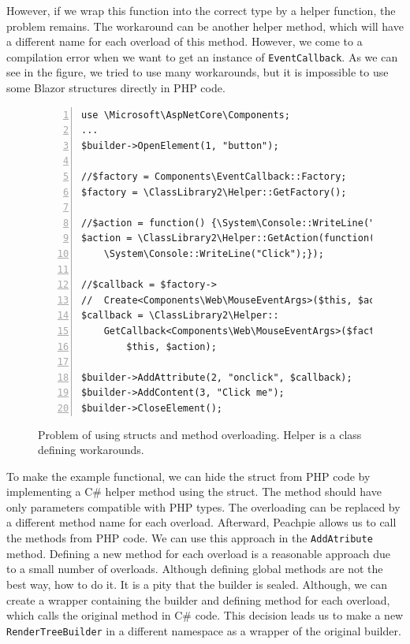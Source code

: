 However, if we wrap this function into the correct type by a helper function, the problem remains.
The workaround can be another helper method, which will have a different name for each overload of this method.
However, we come to a compilation error when we want to get an instance of \texttt{EventCallback}.
As we can see in the figure, we tried to use many workarounds, but it is impossible to use some Blazor structures directly in PHP code.
\par
\begin{figure}
\begin{lstlisting}[numbers=left]
use \Microsoft\AspNetCore\Components;
...
$builder->OpenElement(1, "button");
		
//$factory = Components\EventCallback::Factory;
$factory = \ClassLibrary2\Helper::GetFactory();

//$action = function() {\System\Console::WriteLine("Click");}; 
$action = \ClassLibrary2\Helper::GetAction(function() {
	\System\Console::WriteLine("Click");});
		
//$callback = $factory->
//	Create<Components\Web\MouseEventArgs>($this, $action);
$callback = \ClassLibrary2\Helper::
	GetCallback<Components\Web\MouseEventArgs>($factory, 
		$this, $action);

$builder->AddAttribute(2, "onclick", $callback);
$builder->AddContent(3, "Click me");
$builder->CloseElement();
\end{lstlisting}
\caption{Problem of using structs and method overloading. Helper is a class defining workarounds.}
\label{img15:problems}
\end{figure}
\par
To make the example functional, we can hide the struct from PHP code by implementing a C\# helper method using the struct.
The method should have only parameters compatible with PHP types. 
The overloading can be replaced by a different method name for each overload.
Afterward, Peachpie allows us to call the methods from PHP code.
We can use this approach in the \texttt{AddAtribute} method. 
Defining a new method for each overload is a reasonable approach due to a small number of overloads.
Although defining global methods are not the best way, how to do it.
It is a pity that the builder is sealed. 
Although, we can create a wrapper containing the builder and defining method for each overload, which calls the original method in C\# code.
This decision leads us to make a new \texttt{RenderTreeBuilder}  in a different namespace as a wrapper of the original builder.
\par
